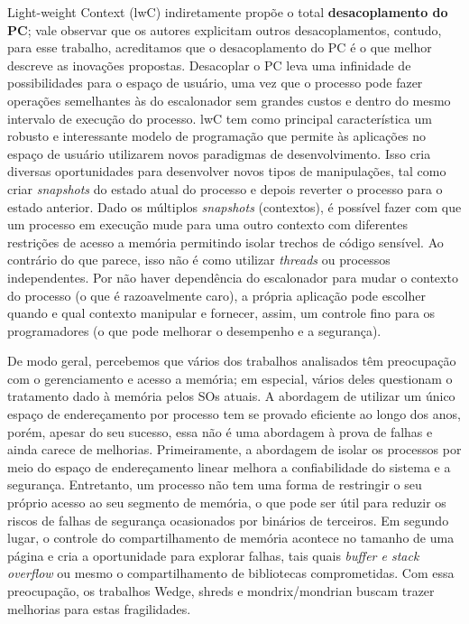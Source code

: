 Light-weight Context (lwC) indiretamente propõe o total
\textbf{desacoplamento do PC}; vale observar que os autores explicitam outros
desacoplamentos, contudo, para esse trabalho, acreditamos que o desacoplamento
do PC é o que melhor descreve as inovações propostas. Desacoplar o PC leva uma
infinidade de possibilidades para o espaço de usuário, uma vez que o processo
pode fazer operações semelhantes às do escalonador sem grandes custos e dentro
do mesmo intervalo de execução do processo. lwC tem como principal
característica um robusto e interessante modelo de programação que permite
às aplicações no espaço de usuário utilizarem novos paradigmas de desenvolvimento.
Isso cria diversas oportunidades para desenvolver novos tipos de manipulações,
tal como criar \emph{snapshots} do estado atual do processo e depois reverter o
processo para o estado anterior. Dado os múltiplos \emph{snapshots}
(contextos), é possível fazer com que um processo em execução mude para uma
outro contexto com diferentes restrições de acesso a memória permitindo isolar
trechos de código sensível.  Ao contrário do que parece, isso não é como
utilizar \emph{threads} ou processos independentes. Por não haver dependência
do escalonador para mudar o contexto do processo (o que é razoavelmente caro),
a própria aplicação pode escolher quando e qual contexto manipular e fornecer,
assim, um controle fino para os programadores (o que pode melhorar o desempenho
e a segurança).

De modo geral, percebemos que vários dos trabalhos analisados têm preocupação com o gerenciamento e acesso a
memória; em especial, vários deles questionam o tratamento dado à memória pelos
SOs atuais.  A abordagem de utilizar um único espaço de endereçamento por
processo tem se provado eficiente ao longo dos anos, porém, apesar do seu
sucesso, essa não é uma abordagem à prova de falhas e ainda carece de
melhorias. Primeiramente, a abordagem de isolar os processos por meio do
espaço de endereçamento linear melhora a confiabilidade do sistema e a
segurança. Entretanto, um processo não tem uma forma de restringir o seu próprio
acesso ao seu segmento de memória, o que pode ser útil para reduzir os riscos de
falhas de segurança ocasionados por binários de terceiros. Em segundo lugar, o
controle do compartilhamento de memória acontece no tamanho de uma página e
cria a oportunidade para explorar falhas, tais quais \emph{buffer e stack
overflow} ou mesmo o compartilhamento de bibliotecas comprometidas. Com essa preocupação, os
trabalhos Wedge, shreds e mondrix/mondrian buscam trazer melhorias para estas fragilidades.

